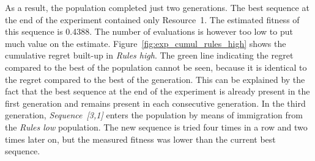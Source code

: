 As a result, the population completed just two generations. The best sequence at the
end of the experiment contained only Resource~1. The estimated fitness of this
sequence is 0.4388. The number of evaluations is however too low to put much
value on the estimate. Figure~\ref{fig:exp_cumul_rules_high} shows the
cumulative regret built-up in \emph{Rules high}. The green line indicating the
regret compared to the best of the population cannot be seen, because it is
identical to the regret compared to the best of the generation. This can be
explained by the fact that the best sequence at the end of the experiment is
already present in the first generation and remains present in each consecutive
generation. In the third generation, \emph{Sequence~[3,1]} enters the population
by means of immigration from the \emph{Rules low} population. The new sequence
is tried four times in a row and two times later on, but the measured fitness
was lower than the current best sequence.
